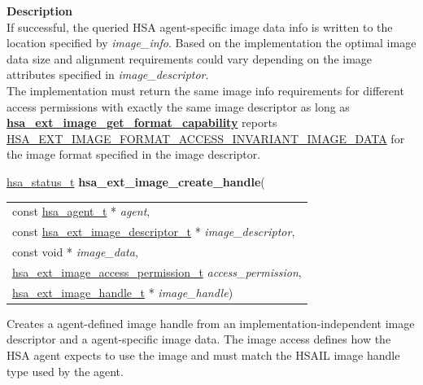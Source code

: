 \documentclass[final]{book}
\newcommand{\hsaarg}[1]{\textit{#1}}
\newcommand{\reffun}[1]{\textbf{#1}}
\begin{document}
\vspace{-4mm}\noindent\textbf{Description}\\[1mm]
If successful, the queried HSA agent-specific image data info is written to the location specified by \textit{image_info}. Based on the implementation the optimal image data size and alignment requirements could vary depending on the image attributes specified in \textit{image_descriptor}.\\[2mm]
The implementation must return the same image info requirements for different access permissions with exactly the same image descriptor as long as \hyperlink{group__images_1gac40dc77fcbc5711552cba2e3631181fd}{\reffun{hsa_ext_image_get_format_capability}} reports \hyperlink{group__images_1ggaef83852ae5fb54b82317e96990da388aa286344b2349f73e9f92400f589a05f60}{HSA_EXT_IMAGE_FORMAT_ACCESS_INVARIANT_IMAGE_DATA} for the image format specified in the image descriptor. 


\noindent\begin{tcolorbox}[breakable,nobeforeafter,colframe=white,colback=lightgray,left=0mm]
\hyperlink{group__status_1gad755322e7ff95456520e8abdbe90d225}{hsa_status_t} \hypertarget{group__images_1gaab643889d22ca4ea75ab16968c15c877}{\textbf{hsa_ext_image_create_handle}}(
\vspace{-3.5mm}\begin{longtable}{@{}p{\textwidth}}
\hspace{1.7em}const \hyperlink{group__topology_1gab8db3fb886332a24acac08ec361e1d86}{hsa_agent_t} * \hsaarg{agent},\\
\hspace{1.7em}const \hyperlink{group__images_1gab0fe2967d35754650148d121fdef2032}{hsa_ext_image_descriptor_t} * \hsaarg{image_descriptor},\\
\hspace{1.7em}const void * \hsaarg{image_data},\\
\hspace{1.7em}\hyperlink{group__images_1gab659478436fb8b92eae3ffe55f09e913}{hsa_ext_image_access_permission_t} \hsaarg{access_permission},\\
\hspace{1.7em}\hyperlink{group__images_1gae59456dc07140b58a2d526bcf01d2d88}{hsa_ext_image_handle_t} * \hsaarg{image_handle})\end{longtable}

\end{tcolorbox}
Creates a agent-defined image handle from an implementation-independent image descriptor and a agent-specific image data. The image access defines how the HSA agent expects to use the image and must match the HSAIL image handle type used by the agent.
\end{document}
